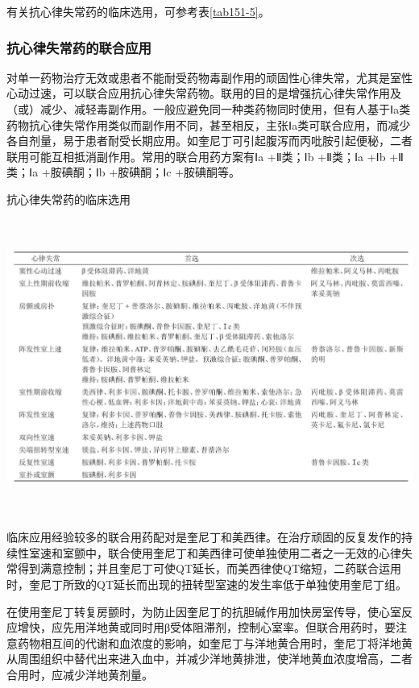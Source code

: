 有关抗心律失常药的临床选用，可参考表\ref{tab151-5}。

\subsubsection{抗心律失常药的联合应用}

对单一药物治疗无效或患者不能耐受药物毒副作用的顽固性心律失常，尤其是室性心动过速，可以联合应用抗心律失常药物。联用的目的是增强抗心律失常作用及（或）减少、减轻毒副作用。一般应避免同一种类药物同时使用，但有人基于Ⅰa类药物抗心律失常作用类似而副作用不同，甚至相反，主张Ⅰa类可联合应用，而减少各自剂量，易于患者耐受长期应用。如奎尼丁可引起腹泻而丙吡胺引起便秘，二者联用可能互相抵消副作用。常用的联合用药方案有Ⅰa
+Ⅱ类；Ⅰb +Ⅱ类；Ⅰa +Ⅰb +Ⅱ类；Ⅰa +胺碘酮；Ⅰb +胺碘酮；Ⅰc +胺碘酮等。

\begin{table}[htbp]
\centering
\caption{抗心律失常药的临床选用}
\label{tab151-5}
\includegraphics[width=6.65625in,height=3.82292in]{./images/Image00574.jpg}
\end{table}

临床应用经验较多的联合用药配对是奎尼丁和美西律。在治疗顽固的反复发作的持续性室速和室颤中，联合使用奎尼丁和美西律可使单独使用二者之一无效的心律失常得到满意控制；并且奎尼丁可使QT延长，而美西律使QT缩短，二药联合运用时，奎尼丁所致的QT延长而出现的扭转型室速的发生率低于单独使用奎尼丁组。

在使用奎尼丁转复房颤时，为防止因奎尼丁的抗胆碱作用加快房室传导，使心室反应增快，应先用洋地黄或同时用β受体阻滞剂，控制心室率。但联合用药时，要注意药物相互间的代谢和血浓度的影响，如奎尼丁与洋地黄合用时，奎尼丁将洋地黄从周围组织中替代出来进入血中，并减少洋地黄排泄，使洋地黄血浓度增高，二者合用时，应减少洋地黄剂量。

